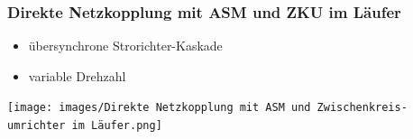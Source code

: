 \subsubsection{Direkte Netzkopplung mit ASM und ZKU im Läufer}

\begin{itemize}
    \item übersynchrone Strorichter-Kaskade
    \item variable Drehzahl
\end{itemize}

\vspace{0.1cm}

\texttt{[image: images/Direkte Netzkopplung mit ASM und Zwischenkreis-umrichter im Läufer.png]}
















